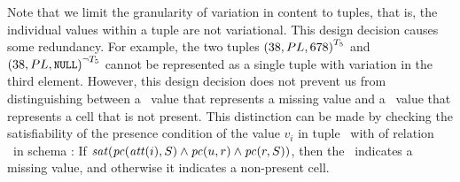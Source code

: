 Note that we limit the granularity of variation in content to tuples, that is,
the individual values within a tuple are not variational.
%
This design decision causes some redundancy.
For example, the two tuples
\ensuremath{\annot [\tFive] {(38, PL, 678)}} and 
\ensuremath{\annot [\neg \tFive] {(38, PL, \nul)}}
cannot be represented as a single tuple
with variation in the third element. However, this design decision
does not prevent us from distinguishing between a \nul\ value
that represents a missing value and a \nul\ value that represents
a cell that is not present. 
This distinction can be made by checking
the satisfiability of 
the presence condition of the value $v_i$ in tuple \vTuple\ with of relation \vRel\ in schema \vSch:
If $\sat{\getPCfrom {\getAtt i} \vSch \wedge \getPCfrom \vTuple \vRel \wedge \getPCfrom \vRel \vSch}$, 
then the \nul\ indicates a missing value,
and otherwise it indicates a non-present cell.
%


